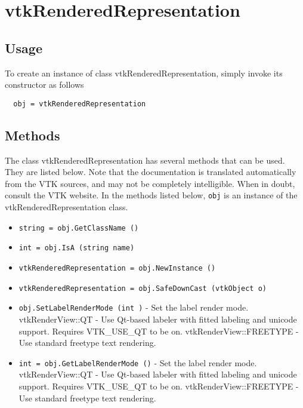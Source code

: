 \section{vtkRenderedRepresentation}

\subsection{Usage}


To create an instance of class vtkRenderedRepresentation, simply
invoke its constructor as follows
\begin{verbatim}
  obj = vtkRenderedRepresentation
\end{verbatim}
\subsection{Methods}

The class vtkRenderedRepresentation has several methods that can be used.
  They are listed below.
Note that the documentation is translated automatically from the VTK sources,
and may not be completely intelligible.  When in doubt, consult the VTK website.
In the methods listed below, \verb|obj| is an instance of the vtkRenderedRepresentation class.
\begin{itemize}
\item  \verb|string = obj.GetClassName ()|

\item  \verb|int = obj.IsA (string name)|

\item  \verb|vtkRenderedRepresentation = obj.NewInstance ()|

\item  \verb|vtkRenderedRepresentation = obj.SafeDownCast (vtkObject o)|

\item  \verb|obj.SetLabelRenderMode (int )| -  Set the label render mode.
 vtkRenderView::QT - Use Qt-based labeler with fitted labeling
   and unicode support. Requires VTK\_USE\_QT to be on.
 vtkRenderView::FREETYPE - Use standard freetype text rendering.

\item  \verb|int = obj.GetLabelRenderMode ()| -  Set the label render mode.
 vtkRenderView::QT - Use Qt-based labeler with fitted labeling
   and unicode support. Requires VTK\_USE\_QT to be on.
 vtkRenderView::FREETYPE - Use standard freetype text rendering.

\end{itemize}

